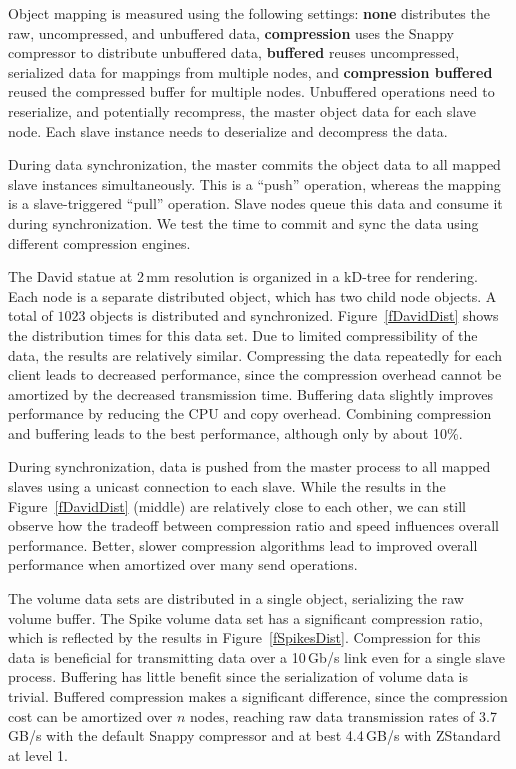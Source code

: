 \documentclass[10pt,journal,compsoc]{IEEEtran}
\newcommand{\fig}[1]{Figure~\ref{#1}}
\begin{document}
Object mapping is measured using the following settings: \textbf{none}
distributes the raw, uncompressed, and unbuffered data, \textbf{compression}
uses the Snappy compressor to distribute unbuffered data, \textbf{buffered}
reuses uncompressed, serialized data for mappings from multiple nodes, and
\textbf{compression buffered} reused the compressed buffer for multiple nodes.
Unbuffered operations need to reserialize, and potentially recompress, the
master object data for each slave node. Each slave instance needs to deserialize
and decompress the data.

During data synchronization, the master commits the object data to all mapped
slave instances simultaneously. This is a ``push'' operation, whereas the
mapping is a slave-triggered ``pull'' operation. Slave nodes queue this data and
consume it during synchronization. We test the time to commit and sync the data
using different compression engines.

The David statue at 2\,mm resolution is organized in a kD-tree for rendering. Each
node is a separate distributed object, which has two child node objects. A
total of $1023$ objects is distributed and synchronized. \fig{fDavidDist} shows
the distribution times for this data set. Due to limited compressibility of the
data, the results are relatively similar. Compressing the data repeatedly for
each client leads to decreased performance, since the compression overhead
cannot be amortized by the decreased transmission time. Buffering data slightly
improves performance by reducing the CPU and copy overhead. Combining
compression and buffering leads to the best performance, although only by about
10\%.

During synchronization, data is pushed from the master process to all mapped
slaves using a unicast connection to each slave. While the results in the
\fig{fDavidDist} (middle) are relatively close to each other, we can still
observe how the tradeoff between compression ratio and speed influences overall
performance. Better, slower compression algorithms lead to improved overall
performance when amortized over many send operations.

The volume data sets are distributed in a single object, serializing the raw
volume buffer. The Spike volume data set has a significant compression ratio,
which is reflected by the results in \fig{fSpikesDist}. Compression for this
data is beneficial for transmitting data over a 10\,Gb/s %
link even for a single
slave process. Buffering has little benefit since the serialization of volume
data is trivial. Buffered compression makes a significant difference, since the
compression cost can be amortized over $n$ nodes, reaching raw data transmission
rates of 3.7\,GB/s with the default Snappy compressor and at best 4.4\,GB/s with
ZStandard at level 1.
\end{document}
